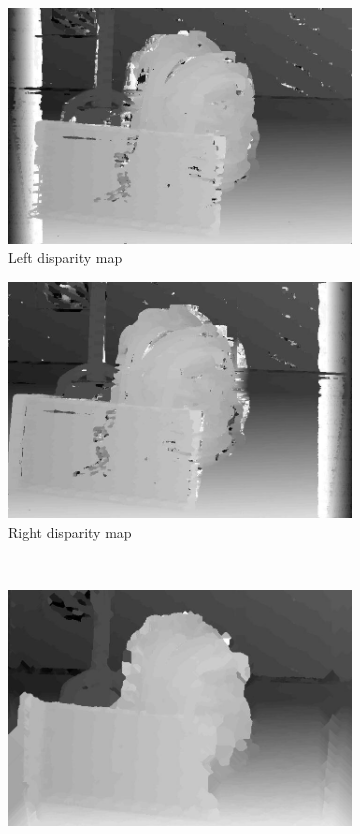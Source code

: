 \documentclass[conference]{IEEEtran}
\begin{document}
\begin{figure}[t!]
\centering
	\begin{subfigure}{0.49\linewidth}
		\centering
		\includegraphics[scale=0.2]{./figures/left_dm.jpg}
 		\caption{Left disparity map}\label{subfig:leftDisparity}
	\end{subfigure}
	\begin{subfigure}{0.49\linewidth}
		\centering
		\includegraphics[scale=0.2]{./figures/right_dm.jpg}
 		\caption{Right disparity map}\label{subfig:rightDisparity}
	\end{subfigure}
\\
	\begin{subfigure}{\linewidth}
		\centering
		\includegraphics[scale=0.43]{./figures/final_dm.jpg}

\end{subfigure}
\end{figure}
\end{document}
